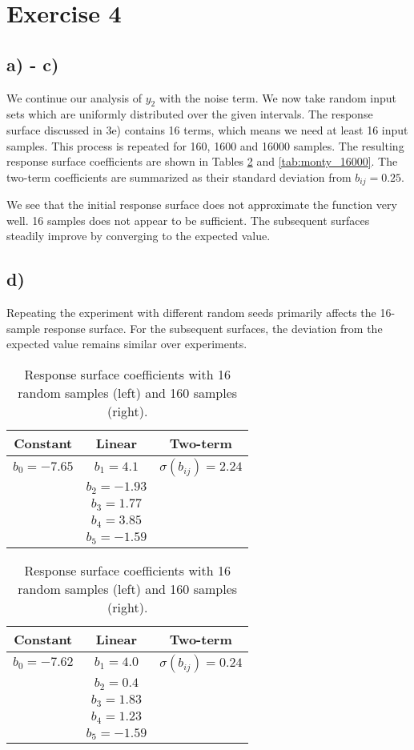 \section*{Exercise 4}

\subsection*{a) - c)}

We continue our analysis of $y_2$ with the noise term. We now take random input sets which are uniformly distributed over the given intervals. The response surface discussed in 3e) contains 16 terms, which means we need at least 16 input samples. This process is repeated for 160, 1600 and 16000 samples. The resulting response surface coefficients are shown in Tables \ref{tab:monty_160} and \ref{tab:monty_16000}. The two-term coefficients are summarized as their standard deviation from $b_{ij} = 0.25$.

We see that the initial response surface does not approximate the function very well. 16 samples does not appear to be sufficient. The subsequent surfaces steadily improve by converging to the expected value.

\subsection*{d)}

Repeating the experiment with different random seeds primarily affects the 16-sample response surface. For the subsequent surfaces, the deviation from the expected value remains similar over experiments.

\begin{table}[h!]
	\centering
	\begin{tabular}{c|c|c}
		Constant & Linear & Two-term \\ \hline
		$b_0 = -7.65$ & $b_1 = 4.1$ & $\sigma(b_{ij}) = 2.24$ \\
		& $b_2 = -1.93$ &  \\
		& $b_3 = 1.77$ &  \\
		& $b_4 = 3.85$ &  \\
		& $b_5 = -1.59$ &  \\
	\end{tabular}
	\quad\quad\quad
	\begin{tabular}{c|c|c}
		Constant & Linear & Two-term \\ \hline
		$b_0 = -7.62$ & $b_1 = 4.0$ & $\sigma(b_{ij}) = 0.24$ \\
		& $b_2 = 0.4$ &  \\
		& $b_3 = 1.83$ &  \\
		& $b_4 = 1.23$ &  \\
		& $b_5 = -1.59$ &  \\
	\end{tabular}
	\caption{Response surface coefficients with 16 random samples (left) and 160 samples (right).}
	\label{tab:monty_160}
\end{table}

